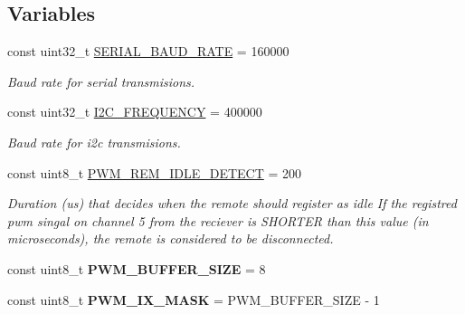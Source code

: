 \subsection*{Variables}
\begin{DoxyCompactItemize}
\item 
const uint32\+\_\+t \hyperlink{group__GlobalVariables_gaf36c84a19930ad4097e8b14e0b689bee}{S\+E\+R\+I\+A\+L\+\_\+\+B\+A\+U\+D\+\_\+\+R\+A\+TE} = 160000\hypertarget{group__GlobalVariables_gaf36c84a19930ad4097e8b14e0b689bee}{}\label{group__GlobalVariables_gaf36c84a19930ad4097e8b14e0b689bee}

\begin{DoxyCompactList}\small\item\em Baud rate for serial transmisions. \end{DoxyCompactList}\item 
const uint32\+\_\+t \hyperlink{group__GlobalVariables_ga95ca7fd95f43bac99d8d90b604cae239}{I2\+C\+\_\+\+F\+R\+E\+Q\+U\+E\+N\+CY} = 400000\hypertarget{group__GlobalVariables_ga95ca7fd95f43bac99d8d90b604cae239}{}\label{group__GlobalVariables_ga95ca7fd95f43bac99d8d90b604cae239}

\begin{DoxyCompactList}\small\item\em Baud rate for i2c transmisions. \end{DoxyCompactList}\item 
const uint8\+\_\+t \hyperlink{group__GlobalVariables_ga81d1b4d200caa7d8d9694709e96f1074}{P\+W\+M\+\_\+\+R\+E\+M\+\_\+\+I\+D\+L\+E\+\_\+\+D\+E\+T\+E\+CT} = 200
\begin{DoxyCompactList}\small\item\em Duration (us) that decides when the remote should register as idle If the registred pwm singal on channel 5 from the reciever is S\+H\+O\+R\+T\+ER than this value (in microseconds), the remote is considered to be disconnected. \end{DoxyCompactList}\item 
const uint8\+\_\+t {\bfseries P\+W\+M\+\_\+\+B\+U\+F\+F\+E\+R\+\_\+\+S\+I\+ZE} = 8\hypertarget{group__GlobalVariables_gae2449e7e1058591bfbfdc0901c185602}{}\label{group__GlobalVariables_gae2449e7e1058591bfbfdc0901c185602}

\item 
const uint8\+\_\+t {\bfseries P\+W\+M\+\_\+\+I\+X\+\_\+\+M\+A\+SK} = P\+W\+M\+\_\+\+B\+U\+F\+F\+E\+R\+\_\+\+S\+I\+ZE -\/ 1\hypertarget{group__GlobalVariables_gafe4b1ae7ffab8edfcd8452cd3fb7bb74}{}\label{group__GlobalVariables_gafe4b1ae7ffab8edfcd8452cd3fb7bb74}


\end{DoxyCompactItemize}
